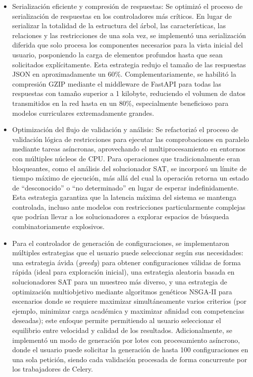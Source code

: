 \begin{itemize}
    \item Serialización eficiente y compresión de respuestas: Se optimizó el proceso de serialización de 
    respuestas en los controladores más críticos. En lugar de serializar la totalidad de la estructura del 
    árbol, las características, las relaciones y las restricciones de una sola vez, se implementó una 
    serialización diferida que solo procesa los componentes necesarios 
    para la vista inicial del usuario, posponiendo la carga de elementos profundos hasta que sean 
    solicitados explícitamente. Esta estrategia redujo el tamaño de las respuestas \ac{JSON} en 
    aproximadamente un 60\%. Complementariamente, se habilitó la compresión GZIP mediante el middleware de FastAPI para todas 
    las respuestas con tamaño superior a 1 kilobyte, reduciendo el volumen de datos transmitidos en la 
    red hasta en un 80\%, especialmente beneficioso para modelos curriculares extremadamente grandes.

    \item Optimización del flujo de validación y análisis: Se refactorizó el proceso de validación lógica 
    de restricciones para ejecutar las comprobaciones en paralelo mediante tareas asíncronas, aprovechando 
    el multiprocesamiento en entornos con múltiples núcleos de CPU. Para operaciones que tradicionalmente 
    eran bloqueantes, como el análisis del solucionador SAT, se incorporó un límite de tiempo máximo de 
    ejecución, más allá del cual la operación retorna un estado de ``desconocido'' o ``no determinado'' en 
    lugar de esperar indefinidamente. Esta estrategia garantiza que la latencia máxima del sistema se 
    mantenga controlada, incluso ante modelos con restricciones particularmente complejas que podrían 
    llevar a los solucionadores a explorar espacios de búsqueda combinatoriamente explosivos.
    
    \item Para el controlador de generación de configuraciones, se implementaron múltiples estrategias 
    que el usuario puede seleccionar según sus necesidades: una estrategia ávida (\textit{greedy}) para 
    obtener configuraciones válidas de forma rápida (ideal para exploración inicial), una estrategia 
    aleatoria basada en solucionadores SAT para un muestreo más diverso, y una estrategia de optimización 
    multiobjetivo mediante algoritmos genéticos NSGA-II para escenarios donde se requiere maximizar 
    simultáneamente varios criterios (por ejemplo, minimizar carga académica y maximizar afinidad con 
    competencias deseadas); este enfoque permite permitiendo al usuario 
    seleccionar el equilibrio entre velocidad y calidad de los resultados.
    Adicionalmente, se implementó un modo de generación por lotes con procesamiento 
    asíncrono, donde el usuario puede solicitar la generación de hasta 100 configuraciones en una sola 
    petición, siendo cada validación procesada de forma concurrente por los trabajadores de Celery.    


\end{itemize}
